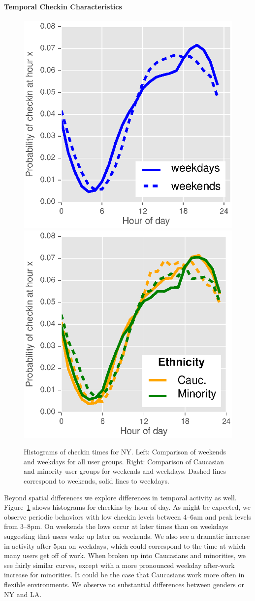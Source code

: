 \paragraph{Temporal Checkin Characteristics}

\begin{figure}[t]
  \centering
  \includegraphics[width=0.49\linewidth]{fig/footprints/time_hist_all_norm.eps}
  \includegraphics[width=0.49\linewidth]{fig/footprints/time_hist_eth_norm.eps}
  \caption{Histograms of checkin times for NY. Left: Comparison of weekends and weekdays for all user groups. Right: Comparison of Caucasian and minority user groups for weekends and weekdays. Dashed lines correspond to weekends, solid lines to weekdays.}
  \label{fig:time_activity}
\end{figure}

Beyond spatial differences we explore differences in temporal activity as well. Figure~\ref{fig:time_activity} shows histograms for checkins by hour of day. As might be expected, we observe periodic behaviors with low checkin levels between 4--6am and peak levels from 3--8pm. On weekends the lows occur at later times than on weekdays suggesting that users wake up later on weekends. We also see a dramatic increase in activity after 5pm on weekdays, which could correspond to the time at which many users get off of work. When broken up into Caucasians and minorities, we see fairly similar curves, except with a more pronounced weekday after-work increase for minorities. It could be the case that Caucasians work more often in flexible environments. We observe no substantial differences between genders or NY and LA.

